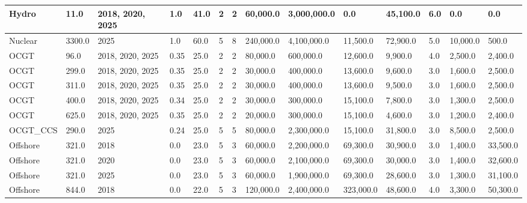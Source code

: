 \begin{table*}[]
\begin{tabularx}{\linewidth}{|p{}|l|x|l|l|l|l|l|l|l|l|l|l|l|}
Hydro                         & 11.0        & 2018, 2020, 2025 & 1.0    & 41.0 & 2     & 2     & 60,000.0  & 3,000,000.0 & 0.0       & 45,100.0 & 6.0   & 0.0      & 0.0       \\ \hline
Nuclear                       & 3300.0      & 2025             & 1.0    & 60.0 & 5     & 8     & 240,000.0 & 4,100,000.0 & 11,500.0  & 72,900.0 & 5.0   & 10,000.0 & 500.0     \\ \hline
OCGT                          & 96.0        & 2018, 2020, 2025 & 0.35   & 25.0 & 2     & 2     & 80,000.0  & 600,000.0   & 12,600.0  & 9,900.0  & 4.0   & 2,500.0  & 2,400.0   \\ \hline
OCGT                          & 299.0       & 2018, 2020, 2025 & 0.35   & 25.0 & 2     & 2     & 30,000.0  & 400,000.0   & 13,600.0  & 9,600.0  & 3.0   & 1,600.0  & 2,500.0   \\ \hline
OCGT                          & 311.0       & 2018, 2020, 2025 & 0.35   & 25.0 & 2     & 2     & 30,000.0  & 400,000.0   & 13,600.0  & 9,500.0  & 3.0   & 1,600.0  & 2,500.0   \\ \hline
OCGT                          & 400.0       & 2018, 2020, 2025 & 0.34   & 25.0 & 2     & 2     & 30,000.0  & 300,000.0   & 15,100.0  & 7,800.0  & 3.0   & 1,300.0  & 2,500.0   \\ \hline
OCGT                          & 625.0       & 2018, 2020, 2025 & 0.35   & 25.0 & 2     & 2     & 20,000.0  & 300,000.0   & 15,100.0  & 4,600.0  & 3.0   & 1,200.0  & 2,400.0   \\ \hline
OCGT\_CCS                     & 290.0       & 2025             & 0.24   & 25.0 & 5     & 5     & 80,000.0  & 2,300,000.0 & 15,100.0  & 31,800.0 & 3.0   & 8,500.0  & 2,500.0   \\ \hline
Offshore                      & 321.0       & 2018             & 0.0    & 23.0 & 5     & 3     & 60,000.0  & 2,200,000.0 & 69,300.0  & 30,900.0 & 3.0   & 1,400.0  & 33,500.0  \\ \hline
Offshore                      & 321.0       & 2020             & 0.0    & 23.0 & 5     & 3     & 60,000.0  & 2,100,000.0 & 69,300.0  & 30,000.0 & 3.0   & 1,400.0  & 32,600.0  \\ \hline
Offshore                      & 321.0       & 2025             & 0.0    & 23.0 & 5     & 3     & 60,000.0  & 1,900,000.0 & 69,300.0  & 28,600.0 & 3.0   & 1,300.0  & 31,100.0  \\ \hline
Offshore                      & 844.0       & 2018             & 0.0    & 22.0 & 5     & 3     & 120,000.0 & 2,400,000.0 & 323,000.0 & 48,600.0 & 4.0   & 3,300.0  & 50,300.0  \\ \hline

\end{tabularx}
\end{table*}
